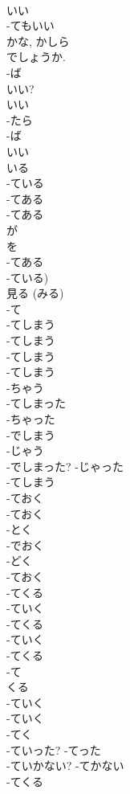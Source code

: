 \documentclass[8pt]{extreport}
\begin{document}
\begin{CJK}{UTF8}{min}
\\	いい	
\\	-てもいい 
\\	かな, かしら 
\\	でしょうか.	
\\	-ば 
\\	いい?	
\\	いい 
\\	-たら 
\\	-ば 
\\	いい	
\\	いる 
\\	-ている 
\\	-てある 
\\	-てある 
\\	が 
\\	を	
\\	-てある 
\\	-ている)	
\\	見る (みる) 
\\	-て 
\\	-てしまう	
\\	-てしまう	
\\	-てしまう	
\\	-てしまう 
\\	-ちゃう	
\\	-てしまった 
\\	-ちゃった	
\\	-でしまう 
\\	-じゃう	
\\	-でしまった?	-じゃった	
\\	-てしまう	
\\	-ておく	
\\	-ておく 
\\	-とく	
\\	-でおく 
\\	-どく	
\\	-ておく	
\\	-てくる	
\\	-ていく	
\\	-てくる 
\\	-ていく 
\\	-てくる 
\\	-て 
\\	くる	
\\	-ていく	
\\	-ていく 
\\	-てく	
\\	-ていった?	-てった	
\\	-ていかない?	-てかない	
\\	-てくる 

\end{CJK}
\end{document}
